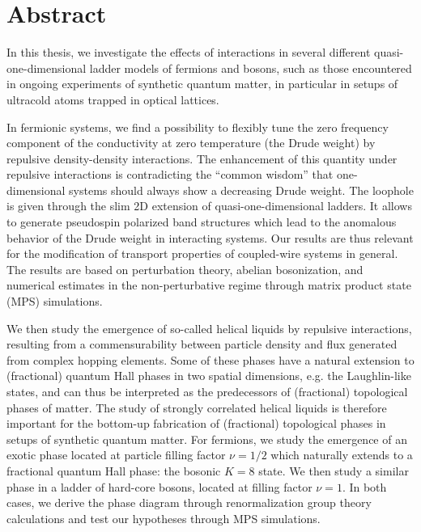 %
\chapter*{Abstract}
%
In this thesis, we investigate the effects of interactions in several different quasi-one-dimensional ladder models of fermions and bosons, such as those encountered in ongoing experiments of synthetic quantum matter, in particular in setups of ultracold atoms trapped in optical lattices.

In fermionic systems, we find a possibility to flexibly tune the zero frequency component of the conductivity at zero temperature (the Drude weight) by repulsive density-density interactions.
The enhancement of this quantity under repulsive interactions is contradicting the ``common wisdom'' that one-dimensional systems should always show a decreasing Drude weight.
The loophole is given through the slim 2D extension of quasi-one-dimensional ladders.
It allows to generate pseudospin polarized band structures which lead to the anomalous behavior of the Drude weight in interacting systems.
Our results are thus relevant for the modification of transport properties of coupled-wire systems in general.
The results are based on perturbation theory, abelian bosonization, and numerical estimates in the non-perturbative regime through matrix product state (MPS) simulations.

We then study the emergence of so-called helical liquids by repulsive interactions, resulting from a commensurability between particle density and flux generated from complex hopping elements.
Some of these phases have a natural extension to (fractional) quantum Hall phases in two spatial dimensions, e.g. the Laughlin-like states, and can thus be interpreted as the predecessors of (fractional) topological phases of matter.
The study of strongly correlated helical liquids is therefore important for the bottom-up fabrication of (fractional) topological phases in setups of synthetic quantum matter.
For fermions, we study the emergence of an exotic phase located at particle filling factor $\nu=1/2$ which naturally extends to a fractional quantum Hall phase: the bosonic $K=8$ state.
We then study a similar phase in a ladder of hard-core bosons, located at filling factor $\nu=1$.
In both cases, we derive the phase diagram through renormalization group theory calculations and test our hypotheses through MPS simulations.

